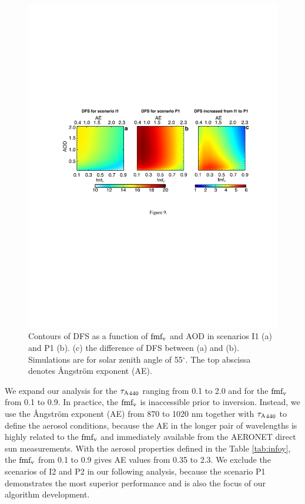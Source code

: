\begin{figure}[t]
  \centering
  \includegraphics[width={\textwidth}]{figures/info09.pdf}
  \caption[Contours of DFS as a function of $\fmfv$ and AOD in scenarios
I1 and P1.]{Contours of DFS as a function of $\fmfv$ and AOD in scenarios
I1 (a) and P1 (b). (c) the difference of DFS between (a) and (b).
Simulations are for solar zenith angle of 55$^\circ$. The top abscissa denotes
Ångström exponent (AE).}
  \label{fig:infodfs2}
\end{figure}

We expand our analysis for the ${\tau_\text{A}}_{440}$ ranging from 0.1 to 2.0 
and for the $\fmfv$ from 0.1 to 0.9. In practice, the $\fmfv$ is 
inaccessible prior to inversion. Instead, we use the 
Ångström exponent (AE) from 870 to 1020 nm together with
${\tau_\text{A}}_{440}$ to define the aerosol conditions, because the AE
in the longer pair of wavelengths is highly related to the $\fmfv$
\citep{Schuster06} and immediately available from the AERONET direct sun 
measurements. With the aerosol properties defined in the Table
\ref{tab:infoy}, the $\fmfv$ from 0.1 to 0.9 gives AE values from
0.35 to 2.3. We exclude the scenarios of I2 and P2 in our following
analysis, because the scenario P1 demonstrates the most superior
performance and is also the focus of our algorithm development.

